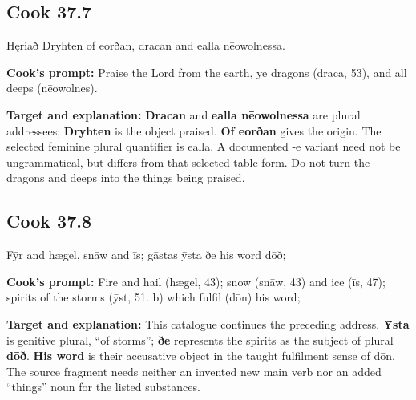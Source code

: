 \par\begin{minipage}{\linewidth}\raggedright
\subsection*{Cook 37.7}

Hęriað Dryhten of eorðan, dracan and ealla nēowolnessa.

\textbf{Cook's prompt:} Praise the Lord from the earth, ye dragons (draca, 53), and all deeps (nēowolnes).

\textbf{Target and explanation:} \textbf{Dracan} and \textbf{ealla nēowolnessa} are plural addressees; \textbf{Dryhten} is the object praised. \textbf{Of eorðan} gives the origin. The selected feminine plural quantifier is ealla. A documented -e variant need not be ungrammatical, but differs from that selected table form. Do not turn the dragons and deeps into the things being praised.

\end{minipage}\par\addvspace{4pt}

\par\begin{minipage}{\linewidth}\raggedright
\subsection*{Cook 37.8}

Fȳr and hægel, snāw and īs; gāstas ȳsta ðe his word dōð;

\textbf{Cook's prompt:} Fire and hail (hægel, 43); snow (snāw, 43) and ice (īs, 47); spirits of the storms (ȳst, 51. b) which fulfil (dōn) his word;

\textbf{Target and explanation:} This catalogue continues the preceding address. \textbf{Ȳsta} is genitive plural, “of storms”; \textbf{ðe} represents the spirits as the subject of plural \textbf{dōð}. \textbf{His word} is their accusative object in the taught fulfilment sense of dōn. The source fragment needs neither an invented new main verb nor an added “things” noun for the listed substances.

\end{minipage}\par\addvspace{4pt}

